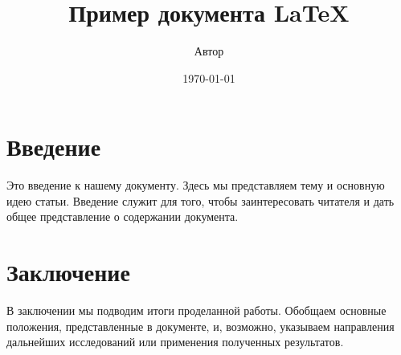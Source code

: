\documentclass{article}
\title{Пример документа LaTeX}
\author{Автор}
\date{\today}
\begin{document}
\maketitle

\section{Введение}
Это введение к нашему документу. Здесь мы представляем тему и основную идею статьи. Введение служит для того, чтобы заинтересовать читателя и дать общее представление о содержании документа.

\section{Заключение}
В заключении мы подводим итоги проделанной работы. Обобщаем основные положения, представленные в документе, и, возможно, указываем направления дальнейших исследований или применения полученных результатов.
\end{document}
